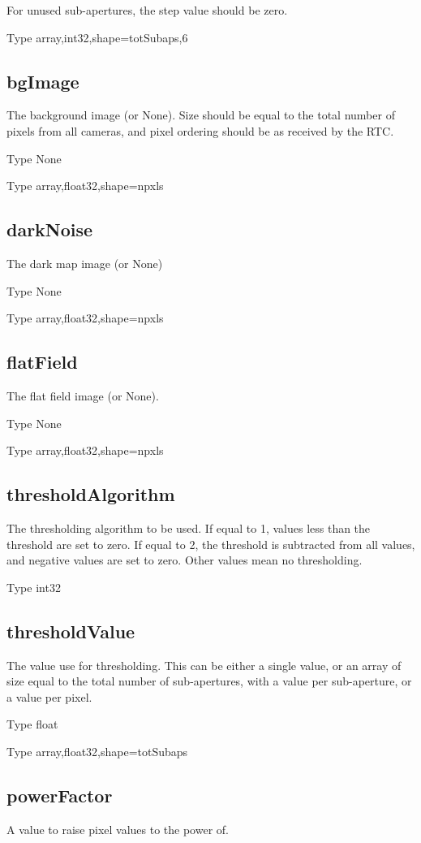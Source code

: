 \documentclass[a4,10pt]{article}
\begin{document}
For unused sub-apertures, the step value should be zero.

Type array,int32,shape=totSubaps,6

\subsection{bgImage}
The background image (or None).  Size should be equal to the total
number of pixels from all cameras, and pixel ordering should be as
received by the RTC.

Type None

Type array,float32,shape=npxls

\subsection{darkNoise}
The dark map image (or None)

Type None

Type array,float32,shape=npxls

\subsection{flatField}
The flat field image (or None).

Type None

Type array,float32,shape=npxls

\subsection{thresholdAlgorithm}
The thresholding algorithm to be used.  If equal to 1, 
values less than the threshold are set to zero.  If equal to 2, the
threshold is subtracted from all values, and negative values are set
to zero.  Other values mean no thresholding.

Type int32

\subsection{thresholdValue}
The value use for thresholding.  This can be either a single value, or
an array of size equal to the total number of sub-apertures, with a
value per sub-aperture, or a value per pixel.

Type float

Type array,float32,shape=totSubaps



\subsection{powerFactor}
A value to raise pixel values to the power of.
\end{document}
